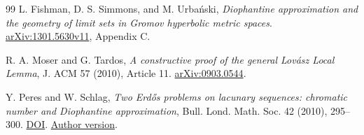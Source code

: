 \documentclass[11pt,reqno,a4paper]{amsart}
\theoremstyle{remark}
\begin{document}
\begin{thebibliography}{99}
L. Fishman, D. S. Simmons, and M. Urba\'nski, \emph{Diophantine approximation and the geometry of limit sets in Gromov hyperbolic metric spaces}. \href{https://arxiv.org/abs/1301.5630v11}{arXiv:1301.5630v11}, Appendix C.

R. A. Moser and G. Tardos, \emph{A constructive proof of the general Lov\'asz Local Lemma}, J. ACM 57 (2010), Article 11. \href{https://arxiv.org/abs/0903.0544}{arXiv:0903.0544}.

Y. Peres and W. Schlag,
\emph{Two Erd\H{o}s problems on lacunary sequences: chromatic number and Diophantine approximation},
Bull. Lond. Math. Soc. 42 (2010), 295--300.
\href{https://doi.org/10.1112/blms/bdp126}{DOI}.
\href{https://arxiv.org/abs/0706.0223}{Author version}.


\end{thebibliography}
\end{document}
